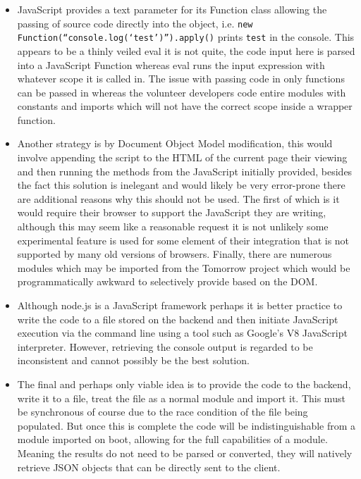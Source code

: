 \documentclass[jou,apacite]{apa6}
\begin{document}
\begin{itemize}
  		\setlength\itemsep{-0.2em}
		\item JavaScript provides a text parameter for its Function class allowing the passing of source code directly into the object, i.e. \texttt{new Function(“console.log(‘test’)”).apply()} prints \texttt{test} in the console. This appears to be a thinly veiled eval it is not quite, the code input here is parsed into a JavaScript Function whereas eval runs the input expression with whatever scope it is called in. The issue with passing code in only functions can be passed in whereas the volunteer developers code entire modules with constants and imports which will not have the correct scope inside a wrapper function.
		\item Another strategy is by Document Object Model modification, this would involve appending the script to the HTML of the current page their viewing and then running the methods from the JavaScript initially provided, besides the fact this solution is inelegant and would likely be very error-prone there are additional reasons why this should not be used. The first of which is it would require their browser to support the JavaScript they are writing, although this may seem like a reasonable request it is not unlikely some experimental feature is used for some element of their integration that is not supported by many old versions of browsers. Finally, there are numerous modules which may be imported from the Tomorrow project which would be programmatically awkward to selectively provide based on the DOM. 
		\item Although node.js is a JavaScript framework perhaps it is better practice to write the code to a file stored on the backend and then initiate JavaScript execution via the command line using a tool such as Google’s V8 JavaScript interpreter. However, retrieving the console output is regarded to be inconsistent and cannot possibly be the best solution.
		\item The final and perhaps only viable idea is to provide the code to the backend, write it to a file, treat the file as a normal module and import it. This must be synchronous of course due to the race condition of the file being populated. But once this is complete the code will be indistinguishable from a module imported on boot, allowing for the full capabilities of a module. Meaning the results do not need to be parsed or converted, they will natively retrieve JSON objects that can be directly sent to the client.
		
	\end{itemize}
	
\end{document}
